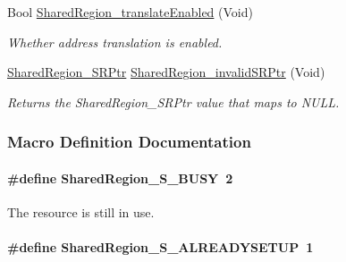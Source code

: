 \begin{DoxyCompactItemize}
Bool \hyperlink{_shared_region_8h_ab6d47a56e271184d92158e88810e9063}{Shared\-Region\-\_\-translate\-Enabled} (Void)
\begin{DoxyCompactList}\small\item\em Whether address translation is enabled. \end{DoxyCompactList}\item 
\hyperlink{_shared_region_8h_a3efe06da0fa1fcbb3b271278ddd9b410}{Shared\-Region\-\_\-\-S\-R\-Ptr} \hyperlink{_shared_region_8h_a9ed41a1be03f81e10b150921c1035467}{Shared\-Region\-\_\-invalid\-S\-R\-Ptr} (Void)
\begin{DoxyCompactList}\small\item\em Returns the Shared\-Region\-\_\-\-S\-R\-Ptr value that maps to N\-U\-L\-L. \end{DoxyCompactList}\end{DoxyCompactItemize}


\subsubsection{Macro Definition Documentation}
\paragraph[{Shared\-Region\-\_\-\-S\-\_\-\-B\-U\-S\-Y}]{\setlength{\rightskip}{0pt plus 5cm}\#define Shared\-Region\-\_\-\-S\-\_\-\-B\-U\-S\-Y~2}\label{_shared_region_8h_a6600547ee6e6f87175f7031004206e9e}


The resource is still in use. 

\paragraph[{Shared\-Region\-\_\-\-S\-\_\-\-A\-L\-R\-E\-A\-D\-Y\-S\-E\-T\-U\-P}]{\setlength{\rightskip}{0pt plus 5cm}\#define Shared\-Region\-\_\-\-S\-\_\-\-A\-L\-R\-E\-A\-D\-Y\-S\-E\-T\-U\-P~1}\label{_shared_region_8h_a016c010c7acdf21d0138f54002eb1783}


